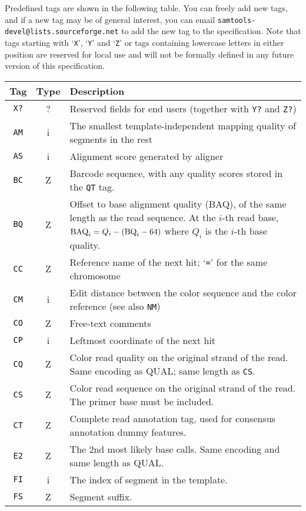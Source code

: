 \documentclass[10pt]{article}
\begin{document}
{Predefined tags are shown in the following table. You can
  freely add new tags, and if a new tag may be of general interest, you
  can email {\tt samtools-devel@lists.sourceforge.net} to add the new tag
  to the specification. Note that tags starting with `{\tt X}', `{\tt Y}'
  and `{\tt Z}' or tags containing lowercase letters in either position
  are reserved for local use and will not be formally
  defined in any future version of this specification.}
\begin{center}\small
\begin{longtable}{ccp{12.5cm}}
  \hline
  {\bf Tag\footnotemark} & {\bf Type} & {\bf Description} \\
  \hline
  {\tt X?} & ? & Reserved fields for end users (together with {\tt Y?} and {\tt Z?}) \\
  {\tt AM} & i & The smallest template-independent mapping quality of segments in the rest \\
  {\tt AS} & i & Alignment score generated by aligner \\
  {\tt BC} & Z & Barcode sequence, with any quality scores stored in the {\tt QT} tag. \\
  {\tt BQ} & Z & Offset to base alignment quality (BAQ), of the same length as the read sequence.
  At the $i$-th read base, ${\rm BAQ}_i=Q_i-({\rm BQ}_i-64)$ where $Q_i$ is the $i$-th base quality. \\
  {\tt CC} & Z & Reference name of the next hit; `{\tt =}' for the same chromosome \\
  {\tt CM} & i & Edit distance between the color sequence and the color reference (see also {\tt NM})\\
  {\tt CO} & Z & Free-text comments \\
  {\tt CP} & i & Leftmost coordinate of the next hit \\ 
  {\tt CQ} & Z & Color read quality on the original strand of the read. Same encoding as {\sf QUAL}; same length as {\tt CS}.\\
  {\tt CS} & Z & Color read sequence on the original strand of the read. The primer base must be included.\\
  {\tt CT} & Z & Complete read annotation tag, used for consensus annotation dummy features.\footnotemark\\
  {\tt E2} & Z & The 2nd most likely base calls. Same encoding and same length as {\sf QUAL}.\\
  {\tt FI} & i & The index of segment in the template.\\
  {\tt FS} & Z & Segment suffix.\\

\end{longtable}
\end{center}
\end{document}
